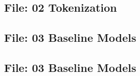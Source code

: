 \documentclass[12pt,a4paper]{report}
\begin{document}
\begin{landscape}
\begin{multicols}{2}
\section{File: 02 Tokenization}

\end{multicols}
\end{landscape}

\begin{landscape}
\begin{multicols}{2}
\section{File: 03 Baseline Models}

\end{multicols}
\end{landscape}

\begin{landscape}
\begin{multicols}{2}
\section{File: 03 Baseline Models}

\end{multicols}
\end{landscape}



\end{document}

